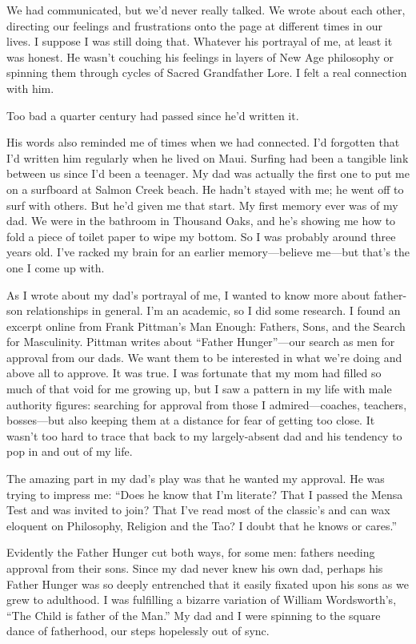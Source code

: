 \documentclass[12pt]{book}
\begin{document}
We had communicated, but we'd never really talked. We wrote about each other, directing our feelings and frustrations onto the page at different times in our lives. I suppose I was still doing that. Whatever his portrayal of me, at least it was honest. He wasn't couching his feelings in layers of New Age philosophy or spinning them through cycles of Sacred Grandfather Lore. I felt a real connection with him.

Too bad a quarter century had passed since he'd written it.

His words also reminded me of times when we had connected. I'd forgotten that I'd written him regularly when he lived on Maui. Surfing had been a tangible link between us since I'd been a teenager. My dad was actually the first one to put me on a surfboard at Salmon Creek beach. He hadn't stayed with me; he went off to surf with others. But he'd given me that start. My first memory ever was of my dad. We were in the bathroom in Thousand Oaks, and he's showing me how to fold a piece of toilet paper to wipe my bottom. So I was probably around three years old. I've racked my brain for an earlier memory---believe me---but that's the one I come up with.

As I wrote about my dad's portrayal of me, I wanted to know more about father-son relationships in general. I'm an academic, so I did some research. I found an excerpt online from Frank Pittman's Man Enough: Fathers, Sons, and the Search for Masculinity. Pittman writes about ``Father Hunger''---our search as men for approval from our dads. We want them to be interested in what we're doing and above all to approve. It was true. I was fortunate that my mom had filled so much of that void for me growing up, but I saw a pattern in my life with male authority figures: searching for approval from those I admired---coaches, teachers, bosses---but also keeping them at a distance for fear of getting too close. It wasn't too hard to trace that back to my largely-absent dad and his tendency to pop in and out of my life.

The amazing part in my dad's play was that he wanted my approval. He was trying to impress me: ``Does he know that I'm literate? That I passed the Mensa Test and was invited to join? That I've read most of the classic's and can wax eloquent on Philosophy, Religion and the Tao? I doubt that he knows or cares.''

Evidently the Father Hunger cut both ways, for some men: fathers needing approval from their sons. Since my dad never knew his own dad, perhaps his Father Hunger was so deeply entrenched that it easily fixated upon his sons as we grew to adulthood. I was fulfilling a bizarre variation of William Wordsworth's, ``The Child is father of the Man.'' My dad and I were spinning to the square dance of fatherhood, our steps hopelessly out of sync.
\end{document}
